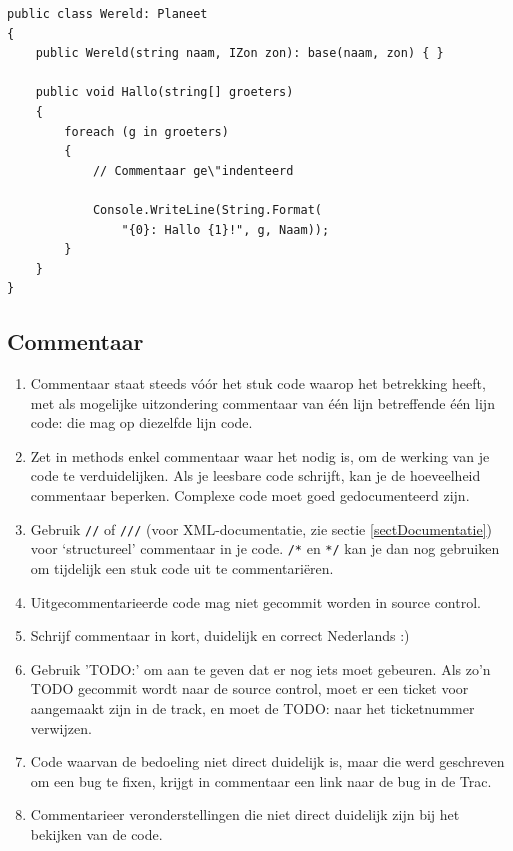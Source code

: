 \documentclass[a4paper,11pt]{article}
\begin{document}
\begin{lstlisting}[float, caption=Indentatie, label=lblLstWhitespace]
public class Wereld: Planeet
{
	public Wereld(string naam, IZon zon): base(naam, zon) { }

	public void Hallo(string[] groeters)
	{
		foreach (g in groeters)
		{
			// Commentaar ge\"indenteerd

			Console.WriteLine(String.Format(
				"{0}: Hallo {1}!", g, Naam));
		}
	}	
}
\end{lstlisting}


\subsection{Commentaar}

\begin{enumerate}[resume]
\item Commentaar staat steeds v\'o\'or het stuk code waarop het betrekking
heeft, met als mogelijke uitzondering commentaar van \'e\'en lijn betreffende \'e\'en
lijn code: die mag op diezelfde lijn code.
\item Zet in methods enkel commentaar waar het nodig is, om de werking van je code te
verduidelijken.  Als je leesbare code schrijft, kan je de hoeveelheid commentaar beperken.
Complexe code moet goed gedocumenteerd zijn.
\item Gebruik \lstinline !//! of \lstinline !///! (voor XML-documentatie, zie sectie
\ref{sectDocumentatie}) voor `structureel'
commentaar in je code.  \lstinline !/*! en \lstinline !*/! kan je dan nog gebruiken om tijdelijk
een stuk code uit te commentari\"eren.
\item Uitgecommentarieerde code mag niet gecommit worden in source control.
\item Schrijf commentaar in kort, duidelijk en correct Nederlands :)
\item Gebruik 'TODO:' om aan te geven dat er nog iets moet gebeuren.  Als
zo'n TODO gecommit wordt naar de source control, moet er een
ticket voor aangemaakt zijn in de track, en moet de TODO: naar het
ticketnummer verwijzen.
\item Code waarvan de bedoeling niet direct duidelijk is, maar die werd
geschreven om een bug te fixen, krijgt in commentaar een link naar de
bug in de Trac.
\item Commentarieer veronderstellingen die niet direct duidelijk zijn bij
het bekijken van de code.
\end{enumerate}
\end{document}
